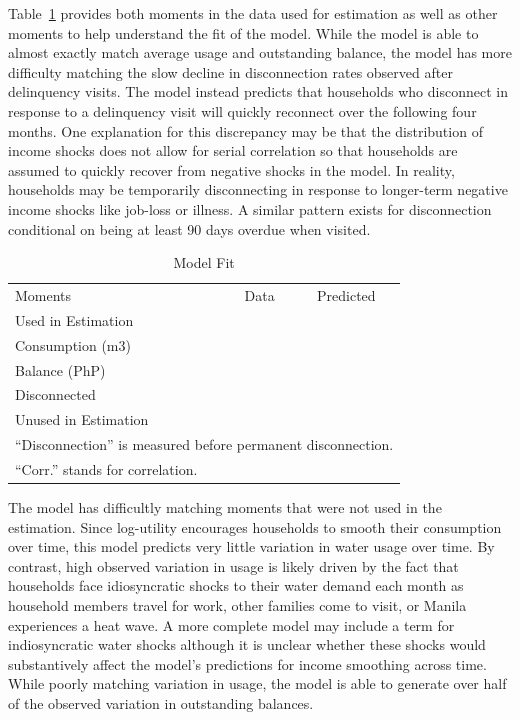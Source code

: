 \documentclass[12pt]{article}
\begin{document}
Table~\ref{table:fit} provides both moments in the data used for estimation as well as other moments to help understand the fit of the model.  While the model is able to almost exactly match average usage and outstanding balance, the model has more difficulty matching the slow decline in disconnection rates observed after delinquency visits.  The model instead predicts that households who disconnect in response to a delinquency visit will quickly reconnect over the following four months.  One explanation for this discrepancy may be that the distribution of income shocks does not allow for serial correlation so that households are assumed to quickly recover from negative shocks in the model.  In reality, households may be temporarily disconnecting in response to longer-term negative income shocks like job-loss or illness.  A similar pattern exists for disconnection conditional on being at least 90 days overdue when visited.

\begin{table}[H]
\centering
\caption{Model Fit}\label{table:fit}

\begin{tabular}{l*{1}{cc}}
\toprule
 Moments & Data  & Predicted \\[.5em]
Used in Estimation & & \\
Consumption (m3) & & \\
Balance (PhP) & & \\
Disconnected &&  \\[.4em]
Unused in Estimation & & \\


\bottomrule
\multicolumn{3}{l}{\scriptsize ``Disconnection'' is measured before permanent disconnection. }  \\[-.5em]
\multicolumn{3}{l}{\scriptsize ``Corr.'' stands for correlation.   }  \\[-.5em]
\end{tabular}
%
\end{table}

The model has difficultly matching moments that were not used in the estimation.  Since log-utility encourages households to smooth their consumption over time, this model predicts very little variation in water usage over time.  By contrast, high observed variation in usage is likely driven by the fact that households face idiosyncratic shocks to their water demand each month as household members travel for work, other families come to visit, or Manila experiences a heat wave.  A more complete model may include a term for indiosyncratic water shocks although it is unclear whether these shocks would substantively affect the model's predictions for income smoothing across time.  While poorly matching variation in usage, the model is able to generate over half of the observed variation in outstanding balances.  
\end{document}
